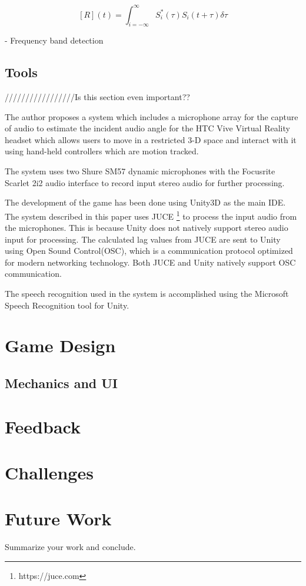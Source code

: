 \documentclass[convention]{aesconf}
\begin{document}
\[ [R] (t)  = \int_{i=-{\infty}}^{\infty} S_i^*(\tau) S_i(t+\tau) \delta \tau  \]

- Frequency band detection 

\subsection{Tools} 
/////////////////Is this section even important??

The author proposes a system which includes a microphone array for the capture of audio to estimate the incident audio angle for the HTC Vive Virtual Reality headset which allows users to move in a restricted 3-D space and interact with it using hand-held controllers which are motion tracked. 

The system uses two Shure SM57 dynamic microphones with the Focusrite Scarlet 2i2 audio interface to record input stereo audio for further processing.

The development of the game has been done using Unity3D as the main IDE. The system described in this paper uses JUCE \footnote{https://juce.com} to process the input audio from the microphones. This is because Unity does not natively support stereo audio input for processing. The calculated lag values from JUCE are sent to Unity using Open Sound Control(OSC), which is a communication protocol optimized for modern networking technology. Both JUCE and Unity natively support OSC communication.

The speech recognition used in the system is accomplished using the Microsoft Speech Recognition tool for Unity. 

\section{Game Design} 

\subsection{Mechanics and UI} 

\section{Feedback} 

\section{Challenges} 

\section{Future Work} 

Summarize your work and conclude.




\end{document}

